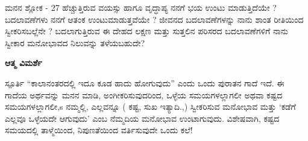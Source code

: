 \begin{mananam}{\mananamfont ಮನನ ಶ್ಲೋಕ - \textenglish{27}}
\footnotesize \mananamtext ಹೆಚ್ಚುತ್ತಿರುವ ವಯಸ್ಸು ಹಾಗೂ ವೃದ್ಧಾಪ್ಯ  ನನಗೆ ಭಯ ಉಂಟು ಮಾಡುತ್ತಿದೆಯೇ ? ಬದಲಾವಣೆಗಳು ನನಗೆ ಆತಂಕ ಉಂಟುಮಾಡುತ್ತವೆಯೇ ? ಜೀವನದ ಬದಲಾವಣೆಗಳನ್ನು ನಾನು ಶಾಂತ ರೀತಿಯಿಂದ ಸ್ವೀಕರಿಸಬಲ್ಲೆನೇ ? ಬದಲಾಗುತ್ತಿರುವ ಈ ದೇಹದ ಲಕ್ಷಣ ಮತ್ತು ಸುತ್ತಲಿನ ಪರಿಸರದ ಬದಲಾವಣೆಗಳಿಗೆ ನಾನು ಸ್ವೀಕಾರ ಮನೋಭಾವದ ನಿಲುವನ್ನು ತಳೆಯಬಹುದೇ?
\end{mananam}
\WritingHand\enspace\textbf{ಆತ್ಮ ವಿಮರ್ಶೆ}
\begin{inspiration}{\mananamfont ಸ್ಪೂರ್ತಿ}
\footnotesize \mananamtext  “ಕಾಲಾನಂತರದಲ್ಲಿ ಇದೂ ಕೂಡ ಹಾದು ಹೋಗುವುದು”  ಎಂದು ಒಂದು ಪುರಾತನ ಗಾದೆ ಇದೆ. ಈ ಗಾದೆಯ ಅರ್ಥವನ್ನು ಮನನ ಮಾಡಿ, ಅಂಗೀಕರಿಸುವುದರಿಂದ,  ಒಳ್ಳೆಯ ಸಮಯಗಳಲ್ಲಾಗಲೀ ಅಥವಾ ಕಷ್ಟದ ಸಮಯಗಳಲ್ಲಾಗಲೀ,s ನಮ್ಮಲ್ಲಿ, ಎಲ್ಲವನ್ನೂ ( ಕಷ್ಟ, ಸುಖ ಇತ್ಯಾದಿ.,) ಸ್ವೀಕರಿಸುವ ಮನೋಭಾವ ಮತ್ತು  ‘ಕಡೆಗೆ ಎಲ್ಲವೂ ಒಳ್ಳೆಯದೇ  ಆಗುವುದು’ ಎಂಬ ನೆಮ್ಮದಿಯ ಮನೋಭಾವ ಉಂಟಾಗುವುದು. ವಿಶೇಷವಾಗಿ, ಕಷ್ಟದ ಸಮಯದಲ್ಲಿ ತಾಳ್ಮೆಯಿಂದ, ನಿಪುಣತೆಯಿಂದ ವರ್ತಿಸುವುದೇ ಒಂದು ಕಲೆ!
\end{inspiration}
\newpage

